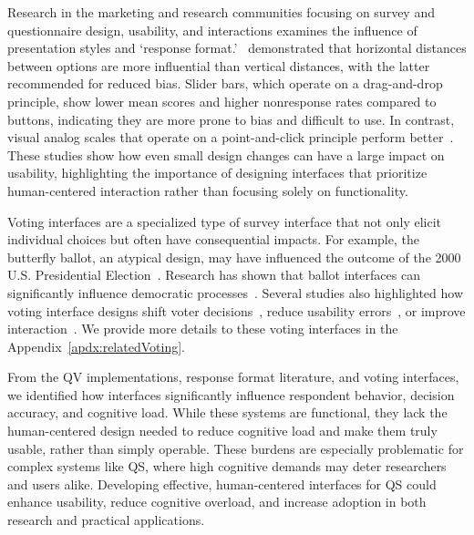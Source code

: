 Research in the marketing and research communities focusing on survey and questionnaire design, usability, and interactions examines the influence of presentation styles and `response format.'~\textcite{weijtersExtremityHorizontalVertical2021} demonstrated that horizontal distances between options are more influential than vertical distances, with the latter recommended for reduced bias. Slider bars, which operate on a drag-and-drop principle, show lower mean scores and higher nonresponse rates compared to buttons, indicating they are more prone to bias and difficult to use. In contrast, visual analog scales that operate on a point-and-click principle perform better~\cite{toepoelSlidersVisualAnalogue2018}. These studies show how even small design changes can have a large impact on usability, highlighting the importance of designing interfaces that prioritize human-centered interaction rather than focusing solely on functionality.

Voting interfaces are a specialized type of survey interface that not only elicit individual choices but often have consequential impacts. For example, the butterfly ballot, an atypical design, may have influenced the outcome of the 2000 U.S. Presidential Election~\cite{wandButterflyDidIt2001}. Research has shown that ballot interfaces can significantly influence democratic processes~\cite{engstrom2020politics, chisnellDemocracyDesignProblem2016, DesigningUsableBallots2015}. Several studies also highlighted how voting interface designs shift voter decisions~\cite{engstrom2020politics}, reduce usability errors~\cite{quesenberyOpinionGoodDesign2020, everettElectronicVotingMachines2008}, or improve interaction~\cite{leeUniversalDesignBallot2016, summers2014making, dawkinsPrimeIIIInnovative2009, gilbertAnomalyDetectionElectronic2013, conradElectronicVotingEliminates2009}. We provide more details to these voting interfaces in the Appendix~\ref{apdx:relatedVoting}.

From the QV implementations, response format literature, and voting interfaces, we identified how interfaces significantly influence respondent behavior, decision accuracy, and cognitive load. While these systems are functional, they lack the human-centered design needed to reduce cognitive load and make them truly usable, rather than simply operable. These burdens are especially problematic for complex systems like QS, where high cognitive demands may deter researchers and users alike. Developing effective, human-centered interfaces for QS could enhance usability, reduce cognitive overload, and increase adoption in both research and practical applications.
